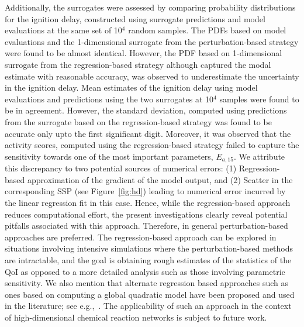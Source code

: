 Additionally, the surrogates were assessed by comparing probability
distributions for the ignition delay,
constructed using surrogate predictions and model evaluations at the same set
of 10$^4$ random samples. The PDFs based on model evaluations and the
1-dimensional surrogate from the perturbation-based strategy were found to be
almost identical. However, the PDF based on 1-dimensional surrogate from the
regression-based strategy although captured the modal estimate with reasonable
accuracy, was observed to underestimate the uncertainty in the ignition delay.
Mean estimates of the ignition delay using model evaluations and predictions
using the two surrogates at 10$^4$ samples were found to be in agreement.
However, the standard deviation, computed using predictions from
the surrogate based on the regression-based strategy was found to be accurate
only upto the first significant digit. Moreover, it was observed that the
activity scores, computed using the regression-based strategy failed to capture
the sensitivity towards one of the most important parameters, $E_{a,15}$.  We attribute
this discrepancy to two potential sources of numerical errors: (1)
Regression-based approximation of the gradient of the model output, and (2)
Scatter in the corresponding SSP (see Figure~\ref{fig:hd}) leading to numerical
error incurred by the linear regression fit in this case. Hence, while the
regression-based approach 
reduces computational effort, the present investigations clearly reveal
potential pitfalls associated with this approach. 
%
Therefore, in general perturbation-based approaches are preferred. The
regression-based approach can be explored in situations involving intensive
simulations where the perturbation-based methods are intractable, and the goal
is obtaining rough estimates of the statistics of the QoI as opposed to a more
detailed analysis such as those involving parametric sensitivity.  We also
mention that alternate regression based approaches such as ones based on
computing a global quadratic model have been proposed and used in the
literature; see e.g.,~\cite{ConstantineDoostan17}. The applicability of such an
approach in the context of high-dimensional chemical reaction networks is
subject to future work. 

